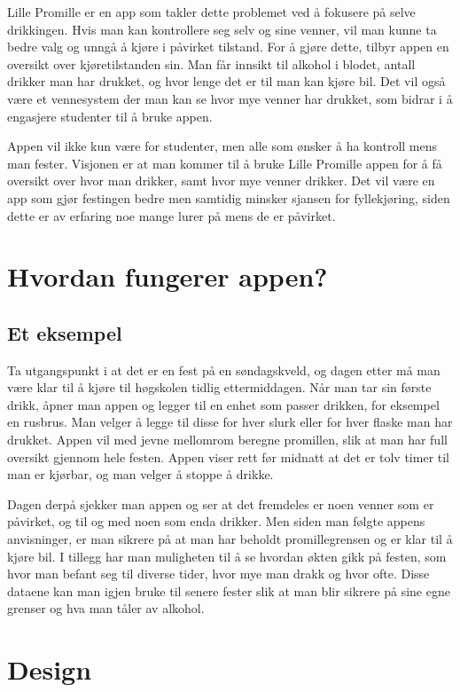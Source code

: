 \documentclass[12pt]{article}
\begin{document}
Lille Promille er en app som takler dette problemet ved å fokusere på selve drikkingen. Hvis man kan kontrollere seg selv og sine venner, vil man kunne ta bedre valg og unngå å kjøre i påvirket tilstand. For å gjøre dette, tilbyr appen en oversikt over kjøretilstanden sin. Man får innsikt til alkohol i blodet, antall drikker man har drukket, og hvor lenge det er til man kan kjøre bil. Det vil også være et vennesystem der man kan se hvor mye venner har drukket, som bidrar i å engasjere studenter til å bruke appen.

Appen vil ikke kun være for studenter, men alle som ønsker å ha kontroll mens man fester. Visjonen er at man kommer til å bruke Lille Promille appen for å få oversikt over hvor man drikker, samt hvor mye venner drikker. Det vil være en app som gjør festingen bedre men samtidig minsker sjansen for fyllekjøring, siden dette er av erfaring noe mange lurer på mens de er påvirket.

\section{Hvordan fungerer appen?}
\subsection{Et eksempel}
Ta utgangspunkt i at det er en fest på en søndagskveld, og dagen etter må man være klar til å kjøre til høgskolen tidlig ettermiddagen. Når man tar sin første drikk, åpner man appen og legger til en enhet som passer drikken, for eksempel en rusbrus. Man velger å legge til disse for hver slurk eller for hver flaske man har drukket. Appen vil med jevne mellomrom beregne promillen, slik at man har full oversikt gjennom hele festen. Appen viser rett før midnatt at det er tolv timer til man er kjørbar, og man velger å stoppe å drikke.

Dagen derpå sjekker man appen og ser at det fremdeles er noen venner som er påvirket, og til og med noen som enda drikker. Men siden man følgte appens anvisninger, er man sikrere på at man har beholdt promillegrensen og er klar til å kjøre bil. I tillegg har man muligheten til å se hvordan økten gikk på festen, som hvor man befant seg til diverse tider, hvor mye man drakk og hvor ofte. Disse dataene kan man igjen bruke til senere fester slik at man blir sikrere på sine egne grenser og hva man tåler av alkohol.

\section{Design}
\end{document}
